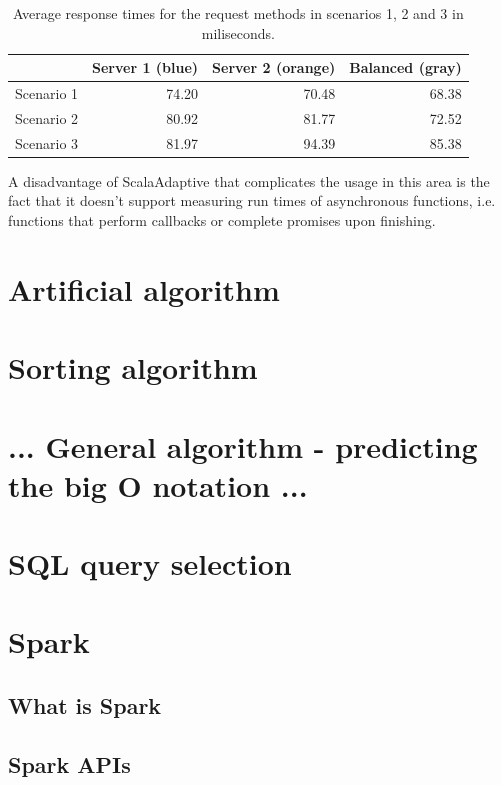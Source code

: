 \begin{table}[h!]
	\centering
	\captionsetup{justification=centering,margin=0.5cm}
		\bgroup
	\def\arraystretch{1.5}%
	
	\begin{tabular}{|l|r|r|r|}
		\hline
		& \textbf{Server 1} (blue)& \textbf{Server 2} (orange)& \textbf{Balanced} (gray)\\ \hline
		Scenario 1 & 74.20             & 70.48             & 68.38             \\ \hline
		Scenario 2 & 80.92             & 81.77             & 72.52             \\ \hline
		Scenario 3 & 81.97             & 94.39             & 85.38             \\ \hline
	\end{tabular}
	\egroup
	\caption{Average response times for the request methods in scenarios 1, 2 and 3 in miliseconds.}
\label{tab:load_balance_resp_avgs}
\end{table}

A disadvantage of ScalaAdaptive that complicates the usage in this area is the fact that it doesn't support measuring run times of asynchronous functions, i.e. functions that perform callbacks or complete promises upon finishing.

\section{Artificial algorithm}
\section{Sorting algorithm}
\section{... General algorithm - predicting the big O notation ...}
\section{SQL query selection}
\section{Spark}
\subsection{What is Spark}

\subsection{Spark APIs}

